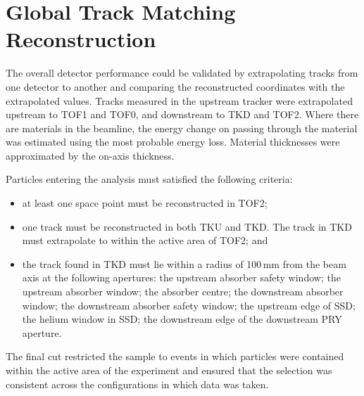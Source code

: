 \graphicspath{{08-Track-matching/Figures/}}

\section{Global Track Matching Reconstruction}
\label{Sect:TM}


\newcommand{\topmatterallplots}[4]{%
    \hspace*{-2.0cm}\texttt{[image: \#1/Figures/\#2/\#3.png]}
    \caption{#4 \label{fig:#3}}
    }

The overall detector performance could be validated by extrapolating tracks from
one detector to another and comparing the reconstructed coordinates with the 
extrapolated values.
Tracks measured in the upstream tracker were extrapolated upstream to TOF1 and TOF0, and downstream
to TKD and TOF2. Where there are materials in the beamline, the energy change on
passing through the material was estimated using the most probable energy loss. 
Material thicknesses were approximated by the on-axis thickness. 

Particles entering the analysis must satisfied the following criteria:
\begin{itemize}
\item at least one space point must be reconstructed in TOF2;
\item one track must be reconstructed in both TKU and TKD. The track in TKD must extrapolate to within the active area of TOF2; and
\item the track found in TKD must lie within a radius of 100\,mm from the beam axis at the following apertures:
the upstream absorber safety window; the upstream absorber window; the absorber centre; the downstream absorber window; the downstream absorber safety window; the upstream edge of SSD; the helium window in SSD; the downstream edge of the downstream PRY aperture.
\end{itemize}
The final cut restricted the sample to events in which particles were contained within the active area of the experiment and ensured that the selection was consistent across the configurations in which data was taken.



